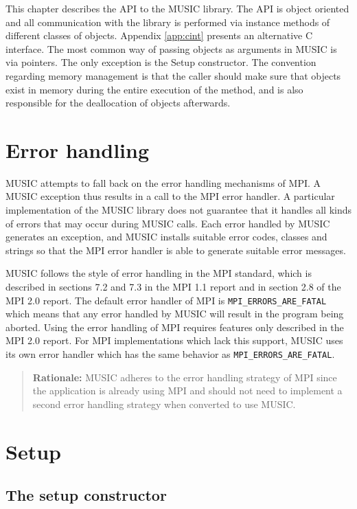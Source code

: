 \documentclass[a4paper,twoside]{report}
\newenvironment{rationale}%
{\par\begin{quote}\textbf{Rationale:}}%
{\par\end{quote}}
\begin{document}
This chapter describes the API to the MUSIC library.  The API is
object oriented and all communication with the library is performed
via instance methods of different classes of objects.  Appendix
\ref{app:cint} presents an alternative C interface.  The most common
way of passing objects as arguments in MUSIC is via pointers.  The
only exception is the Setup constructor.  The convention regarding
memory management is that the caller should make sure that objects
exist in memory during the entire execution of the method, and is also
responsible for the deallocation of objects afterwards.


\section{Error handling}

MUSIC attempts to fall back on the error handling mechanisms of MPI.
A MUSIC exception thus results in a call to the MPI error handler.
A particular implementation of the MUSIC library does not guarantee
that it handles all kinds of errors that may occur during MUSIC calls.
Each error handled by MUSIC generates an exception, and MUSIC installs
suitable error codes, classes and strings so that the MPI error
handler is able to generate suitable error messages.

MUSIC follows the style of error handling in the MPI standard, which
is described in sections 7.2 and 7.3 in the MPI 1.1
report\cite{mpi1.1} and in section 2.8 of the MPI 2.0
report\cite{mpi2.0}.  The default error handler of MPI is
\lstinline|MPI_ERRORS_ARE_FATAL| which means that any error handled by
MUSIC will result in the program being aborted.  Using the error
handling of MPI requires features only described in the MPI 2.0
report.  For MPI implementations which lack this support, MUSIC uses
its own error handler which has the same behavior as
\lstinline|MPI_ERRORS_ARE_FATAL|.

\begin{rationale}
  MUSIC adheres to the error handling strategy of MPI since the
  application is already using MPI and should not need to implement a
  second error handling strategy when converted to use MUSIC.
\end{rationale}

\section{Setup}

\subsection{The setup constructor}
\end{document}
